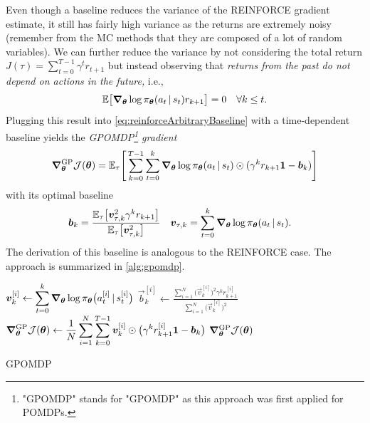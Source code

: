 			Even though a baseline reduces the variance of the REINFORCE gradient estimate, it still has fairly high variance as the returns are extremely noisy (remember from the \ac{MC} methods that they are composed of a lot of random variables). We can further reduce the variance by not considering the total return \( J(\tau) = \sum_{t = 0}^{T - 1} \gamma^t r_{t + 1} \) but instead observing that \emph{returns from the past do not depend on actions in the future,} i.e.,
			\begin{equation}
				\mathbb{E}\bigl[ \grad_{\bm{\theta}} \log \pi_{\bm{\theta}}(a_t \,\vert\, s_t) r_{k + 1} \bigr] = 0 \quad\forall k \leq t.
			\end{equation}
			Plugging this result into \eqref{eq:reinforceArbitraryBaseline} with a time-dependent baseline yields the \emph{\ac{GPOMDP}\footnote{"\acs{GPOMDP}" stands for "\acl{GPOMDP}" as this approach was first applied for \acp{POMDP}.} gradient}
			\begin{equation}
				\grad_{\bm{\theta}}^\mathrm{GP} \mathcal{J}(\bm{\theta})
					= \mathbb{E}_\tau\Biggl[\, \sum_{k = 0}^{T - 1} \sum_{t = 0}^{k} \grad_{\bm{\theta}} \log \pi_{\bm{\theta}}(a_t \,\vert\, s_t) \odot ( \gamma^k r_{k + 1} \bm{1} - \bm{b}_k ) \Biggr]
			\end{equation}
			with its optimal baseline
			\begin{align}
				\bm{b}_k &= \frac{\mathbb{E}_\tau\bigl[ \bm{v}_{\tau, k}^2 \gamma^k r_{k + 1} \bigr]}{\mathbb{E}_\tau\bigl[ \bm{v}_{\tau, k}^2 \bigr]} &
				\bm{v}_{\tau, k} &= \sum_{t = 0}^{k} \grad_{\bm{\theta}} \log \pi_{\bm{\theta}}(a_t \,\vert\, s_t).
			\end{align}
			The derivation of this baseline is analogous to the REINFORCE case. The approach is summarized in \autoref{alg:gpomdp}.

			\begin{algorithm}  \DontPrintSemicolon
				\(\displaystyle \bm{v}_k^{[i]} \gets \sum_{t = 0}^{k} \grad_{\bm{\theta}} \log \pi_{\bm{\theta}}\bigl( a_t^{[i]} \,\vert\, s_t^{[i]} \bigr) \) \;
				\(\displaystyle \vec{b}_k^{[i]} \gets \frac{\sum_{i = 1}^{N} \bigl(\vec{v}_k^{[i]}\bigr)^2 \gamma^k r_{k + 1}^{[i]}}{\sum_{i = 1}^{N} \bigl(\vec{v}_k^{[i]}\bigr)^2} \)  \quad{}
				\(\displaystyle \grad_{\bm{\theta}}^\mathrm{GP} \mathcal{J}(\bm{\theta}) \gets \frac{1}{N} \sum_{i = 1}^{N} \sum_{k = 0}^{T - 1} \bm{v}_k^{[i]} \odot \bigl( \gamma^k r_{k + 1}^{[i]} \bm{1} - \bm{b}_k \bigr) \)  \quad{}
				\Return \( \grad_{\bm{\theta}}^\mathrm{GP} \mathcal{J}(\bm{\theta}) \) \;
				\caption{\acs{GPOMDP}}
				\label{alg:gpomdp}
			\end{algorithm}

